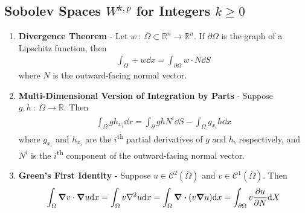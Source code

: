 \documentclass{article}
\begin{document}
    \subsection{Sobolev Spaces $W^{k,p}$ for Integers $k \geq 0$}
    \begin{enumerate}
        \item \textbf{Divergence Theorem} - Let $w\ :\ \overline{\Omega} \subset \mathbb{R}^n \rightarrow \mathbb{R}^n$.  If $\partial\Omega$ is the graph of a Lipschitz function, then
        \begin{align*}
            \int_\Omega \div w \dd x = \int_{\partial \Omega} w \cdot N \dd S
        \end{align*}
        where $N$ is the outward-facing normal vector.
        \item \textbf{Multi-Dimensional Version of Integration by Parts} - Suppose $g,h\ :\ \Omega \rightarrow \mathbb{R}$.  Then
        \begin{align*}
            \int_\Omega g h_{x_i} \dd x = \int_\partial gh N^i \dd S - \int_\Omega g_{x_i}h \dd x
        \end{align*}
        where $g_{x_i}$ and $h_{x_i}$ are the $i$\textsuperscript{th} partial derivatives of $g$ and $h$, respectively, and $N^i$ is the $i$\textsuperscript{th} component of the outward-facing normal vector.
        \item \textbf{Green's First Identity} -  Suppose $u \in \mathcal{C}^2(\overline{\Omega})$ and $v \in \mathcal{C}^1(\overline{\Omega})$.  Then
        \begin{align*}
            \int_\Omega \grad v \cdot \grad u \dd x = \int_\Omega v \laplacian u \dd x = \int_\Omega \div\qty(v\grad u) \dd x = \int_{\partial\Omega} v \frac{\partial u}{\partial N}\dd X
        \end{align*}
    \end{enumerate}
\end{document}
